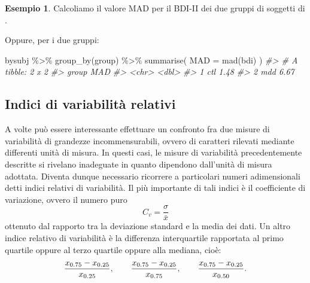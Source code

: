 \documentclass[
  11pt,
  italian,
  a4paper,
  extrafontsizes,onecolumn,openright
  ]{memoir}
\newenvironment{Shaded}{\begin{snugshade}}{\end{snugshade}}
\newcommand{\AttributeTok}[1]{\textcolor[rgb]{0.77,0.63,0.00}{#1}}
\newcommand{\CommentTok}[1]{\textcolor[rgb]{0.56,0.35,0.01}{\textit{#1}}}
\newcommand{\FloatTok}[1]{\textcolor[rgb]{0.00,0.00,0.81}{#1}}
\newcommand{\FunctionTok}[1]{\textcolor[rgb]{0.00,0.00,0.00}{#1}}
\newcommand{\NormalTok}[1]{#1}
\newcommand{\SpecialCharTok}[1]{\textcolor[rgb]{0.00,0.00,0.00}{#1}}
\theoremstyle{definition}
\theoremstyle{definition}
\newtheorem{example}{Esempio}[chapter]
\theoremstyle{definition}
\theoremstyle{definition}
\theoremstyle{remark}
\begin{document}
\begin{example}

Calcoliamo il valore MAD per il BDI-II dei due gruppi di soggetti di \textcite{zetschefuture2019}.

\begin{Shaded}
\end{Shaded}

Oppure, per i due gruppi:

\begin{Shaded}
\begin{Highlighting}[]
\NormalTok{bysubj }\SpecialCharTok{\%\textgreater{}\%} 
  \FunctionTok{group\_by}\NormalTok{(group) }\SpecialCharTok{\%\textgreater{}\%} 
  \FunctionTok{summarise}\NormalTok{(}
    \AttributeTok{MAD =} \FunctionTok{mad}\NormalTok{(bdi)}
\NormalTok{  ) }
\CommentTok{\#\textgreater{} \# A tibble: 2 x 2}
\CommentTok{\#\textgreater{}   group   MAD}
\CommentTok{\#\textgreater{}   \textless{}chr\textgreater{} \textless{}dbl\textgreater{}}
\CommentTok{\#\textgreater{} 1 ctl    1.48}
\CommentTok{\#\textgreater{} 2 mdd    6.67}
\end{Highlighting}
\end{Shaded}

\end{example}

\hypertarget{indici-di-variabilituxe0-relativi}{%
\subsection{Indici di variabilità relativi}\label{indici-di-variabilituxe0-relativi}}

A volte può essere interessante effettuare un confronto fra due misure
di variabilità di grandezze incommensurabili, ovvero di caratteri
rilevati mediante differenti unità di misura. In questi casi, le misure
di variabilità precedentemente descritte si rivelano inadeguate in
quanto dipendono dall'unità di misura adottata. Diventa dunque
necessario ricorrere a particolari numeri adimensionali detti indici
relativi di variabilità. Il più importante di tali indici è il
coefficiente di variazione, ovvero il numero puro
\[C_v = \frac{\sigma}{\bar{x}}\] ottenuto dal rapporto tra la deviazione
standard e la media dei dati. Un altro indice relativo di variabilità è
la differenza interquartile rapportata al primo quartile oppure al terzo
quartile oppure alla mediana, cioè:
\[\frac{x_{0.75} - x_{0.25}}{x_{0.25}}, \qquad \frac{x_{0.75} - x_{0.25}}{x_{0.75}}, \qquad \frac{x_{0.75} - x_{0.25}}{x_{0.50}}.\notag\]
\end{document}
